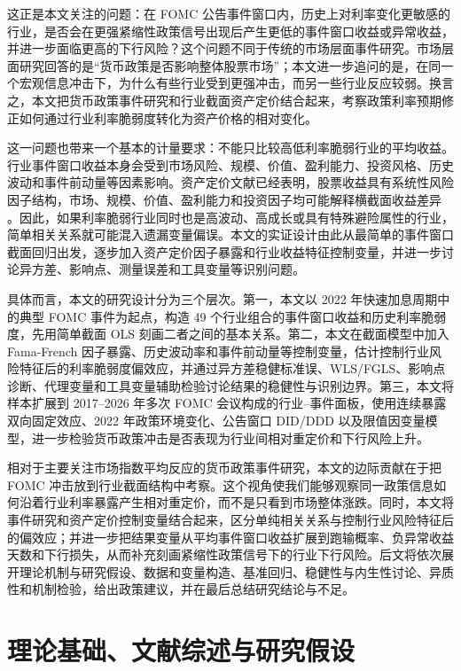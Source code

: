 \documentclass[UTF8,zihao=-4]{ctexart}
\begin{document}
这正是本文关注的问题：在 FOMC 公告事件窗口内，历史上对利率变化更敏感的行业，是否会在更强紧缩性政策信号出现后产生更低的事件窗口收益或异常收益，并进一步面临更高的下行风险？这个问题不同于传统的市场层面事件研究。市场层面研究回答的是“货币政策是否影响整体股票市场”；本文进一步追问的是，在同一个宏观信息冲击下，为什么有些行业受到更强冲击，而另一些行业反应较弱。换言之，本文把货币政策事件研究和行业截面资产定价结合起来，考察政策利率预期修正如何通过行业利率脆弱度转化为资产价格的相对变化。

这一问题也带来一个基本的计量要求：不能只比较高低利率脆弱行业的平均收益。行业事件窗口收益本身会受到市场风险、规模、价值、盈利能力、投资风格、历史波动和事件前动量等因素影响。资产定价文献已经表明，股票收益具有系统性风险因子结构，市场、规模、价值、盈利能力和投资因子均可能解释横截面收益差异 \citep{fama1993common,fama2015five}。因此，如果利率脆弱行业同时也是高波动、高成长或具有特殊避险属性的行业，简单相关关系就可能混入遗漏变量偏误。本文的实证设计由此从最简单的事件窗口截面回归出发，逐步加入资产定价因子暴露和行业收益特征控制变量，并进一步讨论异方差、影响点、测量误差和工具变量等识别问题。

具体而言，本文的研究设计分为三个层次。第一，本文以 2022 年快速加息周期中的典型 FOMC 事件为起点，构造 49 个行业组合的事件窗口收益和历史利率脆弱度，先用简单截面 OLS 刻画二者之间的基本关系。第二，本文在截面模型中加入 Fama-French 因子暴露、历史波动率和事件前动量等控制变量，估计控制行业风险特征后的利率脆弱度偏效应，并通过异方差稳健标准误、WLS/FGLS、影响点诊断、代理变量和工具变量辅助检验讨论结果的稳健性与识别边界。第三，本文将样本扩展到 2017--2026 年多次 FOMC 会议构成的行业--事件面板，使用连续暴露双向固定效应、2022 年政策环境变化、公告窗口 DID/DDD 以及限值因变量模型，进一步检验货币政策冲击是否表现为行业间相对重定价和下行风险上升。

相对于主要关注市场指数平均反应的货币政策事件研究，本文的边际贡献在于把 FOMC 冲击放到行业截面结构中考察。这个视角使我们能够观察同一政策信息如何沿着行业利率暴露产生相对重定价，而不是只看到市场整体涨跌。同时，本文将事件研究和资产定价控制变量结合起来，区分单纯相关关系与控制行业风险特征后的偏效应；并进一步把结果变量从平均事件窗口收益扩展到跑输概率、负异常收益天数和下行损失，从而补充刻画紧缩性政策信号下的行业下行风险。后文将依次展开理论机制与研究假设、数据和变量构造、基准回归、稳健性与内生性讨论、异质性和机制检验，给出政策建议，并在最后总结研究结论与不足。

\section{理论基础、文献综述与研究假设}
\end{document}
